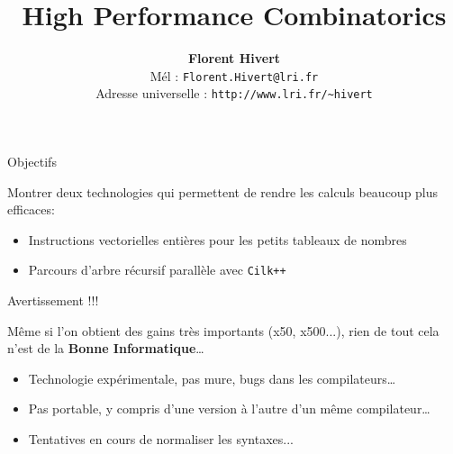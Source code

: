 \documentclass{beamer}
\title[High Performance Combinatorics]%
{\bf High Performance Combinatorics}
\author{\textbf{\Large Florent Hivert}\\[5mm]
  Mél : \texttt{Florent.Hivert@lri.fr}\\
  Adresse universelle : \texttt{http://www.lri.fr/\~{ }hivert}
}
\date{}
\def\opstyle#1{\ensuremath{\operatorname{#1}}}
\begin{document}
\newcommand{\Count}{\opstyle{count}}
\newcommand{\List}{\opstyle{list}}
\newcommand{\Iter}{\opstyle{iter}}
\newcommand{\Unrank}{\opstyle{unrank}}
\newcommand{\Rank}{\opstyle{rank}}
\newcommand{\First}{\opstyle{first}}
\newcommand{\Next}{\opstyle{next}}
\newcommand{\Random}{\opstyle{random}}

\newcommand{\Concat}{\opstyle{concat}}
\newcommand{\BS}{\opstyle{BitString}}
\newcommand{\Perm}{\opstyle{Perm}}
\newcommand{\Union}{\opstyle{Union}}
\newcommand{\Prod}{\opstyle{Prod}}

\newcommand{\Pos}{\opstyle{Pos}}
\newcommand{\Bin}{\opstyle{Bin}}
\newcommand{\Gray}{\opstyle{Gray}}

\newcommand{\mA}{\mathcal{A}}
\newcommand{\mB}{\mathcal{B}}
\newcommand{\mC}{\mathcal{C}}
\newcommand{\mD}{\mathcal{D}}
\newcommand{\mE}{\mathcal{E}}
\newcommand{\mI}{\mathcal{I}}
\newcommand{\mZ}{\mathcal{Z}}

\newcommand{\Oh}{O}

\frame{\titlepage}

\begin{frame}{Objectifs}
\Large

Montrer deux technologies qui permettent de rendre les calculs beaucoup plus
efficaces:\pause\bigskip

\begin{itemize}
\item Instructions vectorielles entières pour les petits tableaux de nombres
\bigskip\pause

\item Parcours d'arbre récursif parallèle avec \texttt{Cilk++}
\end{itemize}
\end{frame}


\begin{frame}{Avertissement !!!}

Même si l'on obtient des gains très importants (x50, x500...), rien de tout
cela n'est de la \textbf{Bonne Informatique}\dots\bigskip

\begin{itemize}
\item Technologie expérimentale, pas mure, bugs dans les compilateurs\dots
\bigskip\pause

\item Pas portable, y compris d'une version à l'autre d'un même compilateur\dots
\bigskip\pause

\item Tentatives en cours de normaliser les syntaxes...
\end{itemize}
\end{frame}
\end{document}
